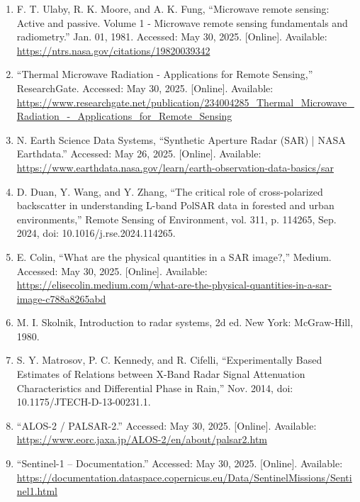 \documentclass{article}
\begin{document}
\begin{sloppypar}
\begin{enumerate}
    \item{F. T. Ulaby, R. K. Moore, and A. K. Fung, “Microwave remote sensing: Active and passive. Volume 1 - Microwave remote sensing fundamentals and radiometry.” Jan. 01, 1981. Accessed: May 30, 2025. [Online]. Available: \url{https://ntrs.nasa.gov/citations/19820039342}}


    \item{“Thermal Microwave Radiation - Applications for Remote Sensing,” ResearchGate. Accessed: May 30, 2025. [Online]. Available: \url{https://www.researchgate.net/publication/234004285_Thermal_Microwave_Radiation_-_Applications_for_Remote_Sensing}}


    \item{N. Earth Science Data Systems, “Synthetic Aperture Radar (SAR) | NASA Earthdata.” Accessed: May 26, 2025. [Online]. Available: \url{https://www.earthdata.nasa.gov/learn/earth-observation-data-basics/sar}}


    \item{D. Duan, Y. Wang, and Y. Zhang, “The critical role of cross-polarized backscatter in understanding L-band PolSAR data in forested and urban environments,” Remote Sensing of Environment, vol. 311, p. 114265, Sep. 2024, doi: 10.1016/j.rse.2024.114265.}

    \item{E. Colin, “What are the physical quantities in a SAR image?,” Medium. Accessed: May 30, 2025. [Online]. Available: \url{https://elisecolin.medium.com/what-are-the-physical-quantities-in-a-sar-image-c788a8265abd}}


    \item{M. I. Skolnik, Introduction to radar systems, 2d ed. New York: McGraw-Hill, 1980.}

    \item{S. Y. Matrosov, P. C. Kennedy, and R. Cifelli, “Experimentally Based Estimates of Relations between X-Band Radar Signal Attenuation Characteristics and Differential Phase in Rain,” Nov. 2014, doi: 10.1175/JTECH-D-13-00231.1.}

    \item{“ALOS-2 / PALSAR-2.” Accessed: May 30, 2025. [Online]. Available: \url{https://www.eorc.jaxa.jp/ALOS-2/en/about/palsar2.htm}}


    \item{“Sentinel-1 – Documentation.” Accessed: May 30, 2025. [Online]. Available: \url{https://documentation.dataspace.copernicus.eu/Data/SentinelMissions/Sentinel1.html}}



\end{enumerate}
\end{sloppypar}
\end{document}
